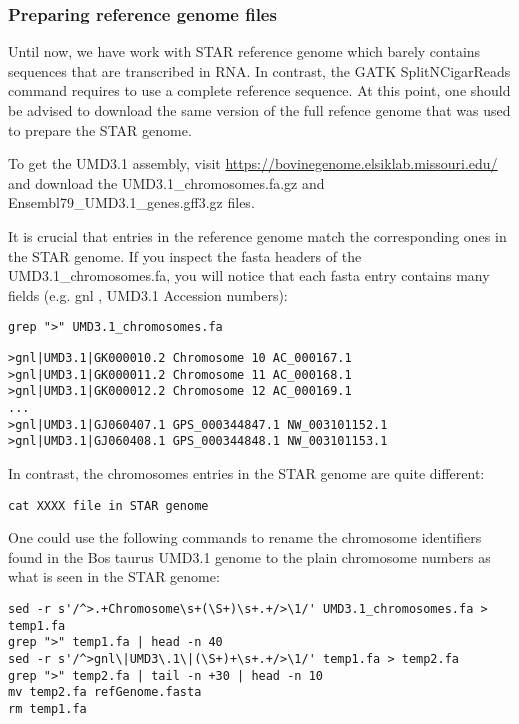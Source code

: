 \subsubsection{Preparing reference genome files}

Until now, we have work with STAR reference genome which barely contains sequences that are transcribed in RNA. In contrast, the GATK SplitNCigarReads command requires to use a complete reference sequence. At this point, one should be advised to download the same version of the full refence genome that was used to prepare the STAR genome.

To get the UMD3.1 assembly, visit \href{https://bovinegenome.elsiklab.missouri.edu/}{https://bovinegenome.elsiklab.missouri.edu/} and download the UMD3.1\_chromosomes.fa.gz and Ensembl79\_UMD3.1\_genes.gff3.gz files.


It is crucial that entries in the reference genome match the corresponding ones in the STAR genome. If you inspect the fasta headers of the UMD3.1\_chromosomes.fa, you will notice that each fasta entry contains many fields (e.g. gnl , UMD3.1 Accession numbers):

\begin{verbatim}
grep ">" UMD3.1_chromosomes.fa
\end{verbatim}


\begin{verbatim}
>gnl|UMD3.1|GK000010.2 Chromosome 10 AC_000167.1
>gnl|UMD3.1|GK000011.2 Chromosome 11 AC_000168.1
>gnl|UMD3.1|GK000012.2 Chromosome 12 AC_000169.1
...
>gnl|UMD3.1|GJ060407.1 GPS_000344847.1 NW_003101152.1
>gnl|UMD3.1|GJ060408.1 GPS_000344848.1 NW_003101153.1
\end{verbatim}

In contrast, the chromosomes entries in the STAR genome are quite different:

\begin{verbatim}
cat XXXX file in STAR genome
\end{verbatim}



One could use the following commands to rename the chromosome identifiers found in the Bos taurus UMD3.1 genome to the plain chromosome numbers as what is seen in the STAR genome:

\begin{verbatim}
sed -r s'/^>.+Chromosome\s+(\S+)\s+.+/>\1/' UMD3.1_chromosomes.fa > temp1.fa
grep ">" temp1.fa | head -n 40
sed -r s'/^>gnl\|UMD3\.1\|(\S+)+\s+.+/>\1/' temp1.fa > temp2.fa
grep ">" temp2.fa | tail -n +30 | head -n 10
mv temp2.fa refGenome.fasta
rm temp1.fa
\end{verbatim}


